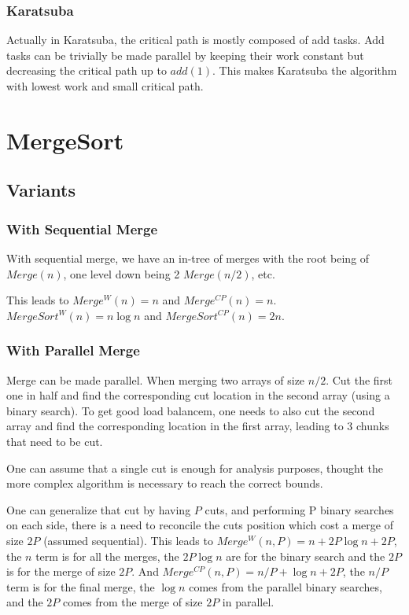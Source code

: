 \documentclass{article}
\begin{document}
\subsubsection{Karatsuba}


Actually in Karatsuba, the critical path is mostly composed of add
tasks. Add tasks can be trivially be made parallel by keeping their
work constant but decreasing the critical path up to $add(1)$. This
makes Karatsuba the algorithm with lowest work and small critical path.

\section{MergeSort}

\subsection{Variants}

\subsubsection{With Sequential Merge}

With sequential merge, we have an in-tree of merges with the root
being of $Merge(n)$, one level down being 2 $Merge(n/2)$, etc.

This leads to $Merge^W(n) = n$ and $Merge^{CP}(n)=n$. $MergeSort^W(n)
= n \log n$ and $MergeSort^{CP}(n) = 2n$.

\subsubsection{With Parallel Merge}

Merge can be made parallel. When merging two arrays of size $n/2$. Cut
the first one in half and find the corresponding cut location in the
second array (using a binary search). To get good load balancem, one
needs to also cut the second array and find the corresponding location
in the first array, leading to 3 chunks that need to be cut.

One can assume that a single cut is enough for analysis purposes,
thought the more complex algorithm is necessary to reach the correct
bounds.

One can generalize that cut by having $P$ cuts, and performing P
binary searches on each side, there is a need to reconcile the cuts
position which cost a merge of size $2P$ (assumed sequential). This leads to $Merge^W(n,P) =
n + 2 P \log n + 2P$, the $n$ term is for all the merges, the $2P \log
n$ are for the binary search and the $2P$ is for the merge of size
$2P$. And $Merge^{CP}(n,P) = n/P + \log n + 2P$, the $n/P$ term
is for the final merge, the $\log n$ comes from the parallel binary
searches, and the $2P$ comes from the merge of size $2P$ in parallel.
\end{document}
